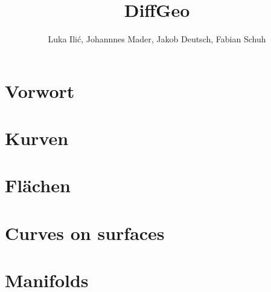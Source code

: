 \documentclass[a4paper,oneside,11pt,DIV=12,parskip=half]{scrartcl}
\title{DiffGeo}
\author{ Luka Ili\'{c}, Johannnes Mader, Jakob Deutsch, Fabian Schuh}
\theoremstyle{plain}
\theoremstyle{definition}
\newtheorem{remark, definition}[theorem]{Bemerkung und Definition.}
\newtheorem{lemma, definition}[theorem]{Lemma und Definition.}
\newtheorem{theorem, definition}[theorem]{Satz und Definition.}
\theoremstyle{remark}
\newtheorem*{remark, example}{\textbf{Bemerkung und Beispiel}}
\begin{document}
\maketitle

\pagebreak

\tableofcontents

\pagebreak

\section*{Vorwort}

\pagebreak

\section{Kurven}

\pagebreak

\section{Flächen}

\pagebreak

\section{Curves on surfaces}

\pagebreak

\section{Manifolds}

\pagebreak
\end{document}
